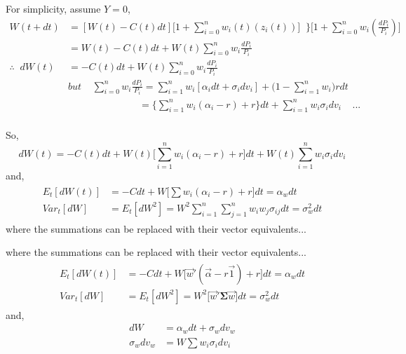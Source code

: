\documentclass[
14pt,notheorems,hyperref={pdfauthor=whatever}
]{beamer}
\begin{document}
\begin{frame}
For simplicity, assume $Y=0$,
\begin{align*}
    W(t+dt) &= [W(t)-C(t)dt] \bigg[1 + \sum_{i=0}^n w_i(t)(z_i(t)) \bigg] \;\;\Bigg\} \bigg[1 + \sum_{i=0}^n w_i(\frac{dP_i}{P_i}) \bigg]\\
    &= W(t)-C(t)dt+W(t)\sum_{i=0}^n w_i\frac{dP_i}{P_i}\\
    \therefore \;\; dW(t) &= -C(t)dt + W(t)\sum_{i=0}^n w_i\frac{dP_i}{P_i}\\
    &\textit{but} \;\;\;\; \sum_{i=0}^n w_i\frac{dP_i}{P_i} = \sum_{i=1}^n w_i[\alpha_i dt + \sigma_i dv_i] + \bigg(1-\sum_{i=1}^n w_i\bigg)r dt\\
    &\;\;\;\;\;\;\;\;\;\;\;\;\;\;\;\;\;\;\;\;\;\;\;\;\;\; = \bigg\{\sum_{i=1}^n w_i(\alpha_i-r) + r \bigg\}dt + \sum_{i=1}^n w_i \sigma_i dv_i \;\;\;\; \textit{...}\\
\end{align*}
\end{frame}

\begin{frame}
So,
\begin{equation} \tag{4}
    dW(t) = -C(t)dt + W(t)\Bigg[\sum_{i=1}^n w_i(\alpha_i-r) + r\Bigg]dt +W(t)\sum_{i=1}^n w_i \sigma_i dv_i
\end{equation}
and,
\begin{align} \tag{5}
\begin{split}
    E_t[dW(t)] &= -Cdt + W\Bigg[\sum w_i(\alpha_i-r) + r\Bigg]dt = \alpha_w dt
    \\
    Var_t[dW] &= E_t[dW^2] = W^2 \sum_{i=1}^n \sum_{j=1}^n w_i w_j \sigma_{ij} dt = \sigma_w^2 dt 
\end{split}
\end{align}
where the summations can be replaced with their vector equivalents...
\end{frame}

\begin{frame}
where the summations can be replaced with their vector equivalents...
\begin{align} \tag{5'}
\begin{split}
    E_t[dW(t)] &= -Cdt + W\bigg[\vec{w}'(\vec\alpha-r\vec1)+r\bigg]dt = \alpha_w dt
    \\
    Var_t[dW] &= E_t[dW^2] = W^2 \bigg[ \vec{w}'\bm{\Sigma}\vec{w}\bigg] dt = \sigma_w^2 dt 
\end{split}
\end{align}
and,
\begin{align*}
    dW &= \alpha_w dt + \sigma_w dv_w\\
    \sigma_w dv_w &= W \sum w_i \sigma_i dv_i\\
\end{align*}
\end{frame}
\end{document}
